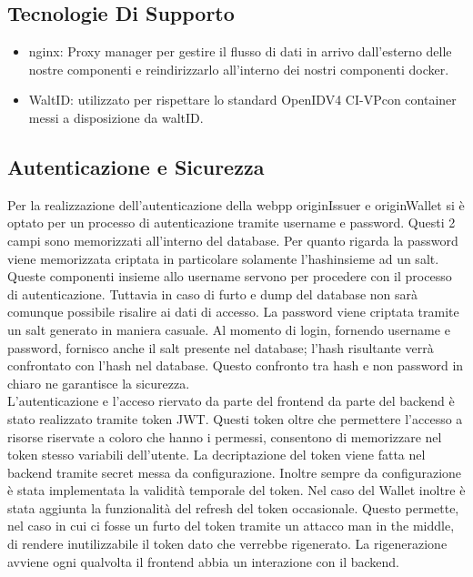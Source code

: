 \subsection{Tecnologie Di Supporto}
\begin{itemize}
    \item nginx: Proxy manager per gestire il flusso di dati in arrivo dall'esterno delle nostre componenti e reindirizzarlo all'interno dei nostri componenti docker.
    \item WaltID: utilizzato per rispettare lo standard OpenIDV4 CI-VP\glo con container messi a disposizione da waltID.
\end{itemize}

\subsection{Autenticazione e Sicurezza}
Per la realizzazione dell'autenticazione della webpp originIssuer e originWallet si è optato per un processo di autenticazione tramite username e password. Questi 2 campi sono memorizzati all'interno del database. Per quanto rigarda la password viene memorizzata criptata in particolare solamente l'hash\glo insieme ad un salt\glo. Queste componenti insieme allo username servono per procedere con il processo di autenticazione. Tuttavia in caso di furto e dump del database non sarà comunque possibile risalire ai dati di accesso. 
La password viene criptata tramite un salt generato in maniera casuale. Al momento di login, fornendo username e password, fornisco anche il salt presente nel database; l'hash risultante verrà confrontato con l'hash nel database. Questo confronto tra hash e non password in chiaro ne garantisce la sicurezza.\\
L'autenticazione e l'acceso riervato da parte del frontend da parte del backend è stato realizzato tramite token JWT\glo. Questi token oltre che permettere l'accesso a risorse riservate a coloro che hanno i permessi, consentono di memorizzare nel token stesso variabili dell'utente. La decriptazione del token viene fatta nel backend tramite secret messa da configurazione. Inoltre sempre da configurazione è stata implementata  la validità temporale del token. Nel caso del Wallet inoltre è stata aggiunta la funzionalità del refresh del token occasionale. Questo permette, nel caso in cui ci fosse un furto del token tramite un attacco man in the middle, di rendere inutilizzabile il token dato che verrebbe rigenerato.  La rigenerazione avviene ogni qualvolta il frontend abbia un interazione con il backend.
